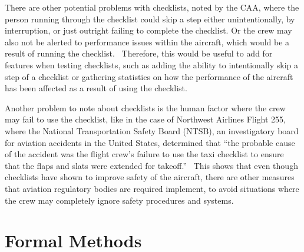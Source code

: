 \documentclass[../dissertation.tex]{subfiles}
\begin{document}
There are other potential problems with checklists,
noted by the CAA, where the person running through the checklist could skip a step
either unintentionally, by interruption, or just outright failing to complete the
checklist. Or the crew may also not be alerted to performance issues within the aircraft,
which would be a result of running the checklist.~\cite{caa:design} Therefore,
this would be useful to add for features when testing checklists, such as
adding the ability to intentionally skip a step of a checklist or gathering
statistics on how the performance of the aircraft has been affected as a result
of using the checklist.

Another problem to note about checklists is the human factor where the crew
may fail to use the checklist, like in the case of Northwest Airlines Flight 255,
where the National Transportation Safety Board (NTSB), an investigatory board
for aviation accidents in the United States, determined that
\enquote{the probable cause of the accident was the flight crew's failure
to use the taxi checklist to ensure that the flaps and slats were extended for takeoff.}~\cite{ntsb:NWA255}
This shows that even though checklists have shown to improve safety of the aircraft,
there are other measures that aviation regulatory bodies are required implement, to avoid
situations where the crew may completely ignore safety procedures and systems.


\section{Formal Methods}

\end{document}
